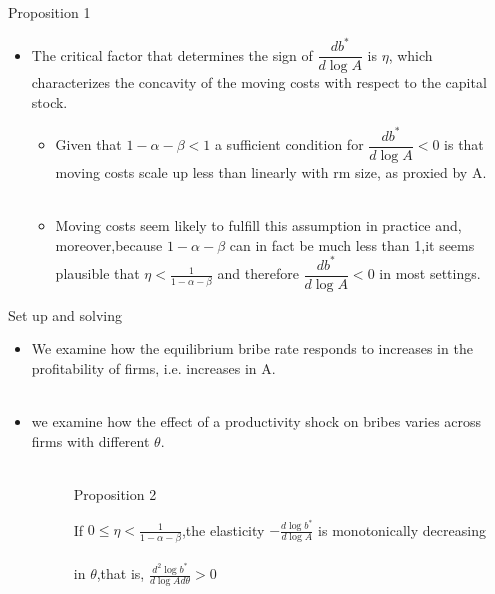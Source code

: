 \documentclass{beamer}
\begin{document}
\begin{frame}{Proposition 1}
\begin{itemize}
\item The critical factor that determines the sign of $\dfrac{db^*}{d\log A}$ is $\eta$, which characterizes
the concavity of the moving costs with respect to the capital stock.
\begin{itemize}
\item Given that $1-\alpha -\beta <1$ a sufficient condition for  $\dfrac{db^*}{d\log A}<0$ is that moving costs scale up less than linearly with rm size, as proxied by A.\\~
\item Moving costs seem likely to fulfill this assumption in practice and, moreover,because $1-\alpha -\beta$ can in fact be much less than 1,it seems plausible that $\eta <\frac{1}{1-\alpha -\beta}$ and therefore  $\dfrac{db^*}{d\log A}<0$ in most settings.

\end{itemize}

\end{itemize}
\end{frame}

\begin{frame}{Set up and solving}

\begin{itemize}
\item We examine how the equilibrium bribe rate responds to increases in the profitability of firms, i.e. increases in A. \\~
\item we examine how the effect of a productivity shock on bribes varies across firms with different $\theta$. \\~

\begin{block}{\ \ \ \ \ \ Proposition 2}

\ \ \ \ \ \ If $0\le \eta <\frac{1}{1-\alpha -\beta}$,the elasticity $-\frac{d\log b^*}{d\log A}$ is monotonically decreasing  \\~\\
\medskip
\ \ \ \ \ \ in $\theta$,that is, $\frac{d^2\log b^*}{d\log Ad\theta}>0$

\end{block}

\end{itemize}

\end{frame}
\end{document}
